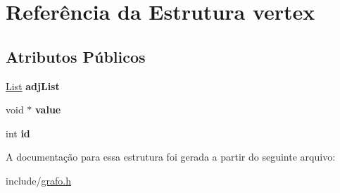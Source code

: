 \hypertarget{structvertex}{}\section{Referência da Estrutura vertex}
\label{structvertex}
\subsection*{Atributos Públicos}
\begin{DoxyCompactItemize}
\item 
\mbox{\label{structvertex_a30d637066c3489c97598af69394d187e}} 
\hyperlink{lista_8h_a698ff83165b8296011a50bb9aba83964}{List} {\bfseries adj\+List}
\item 
\mbox{\label{structvertex_aa610e7fdb75c270e113b935187b31276}} 
void $\ast$ {\bfseries value}
\item 
\mbox{\label{structvertex_a174bbdee712ca98fb591504ce66ed006}} 
int {\bfseries id}
\end{DoxyCompactItemize}


A documentação para essa estrutura foi gerada a partir do seguinte arquivo\+:\begin{DoxyCompactItemize}
\item 
include/\hyperlink{grafo_8h}{grafo.\+h}\end{DoxyCompactItemize}
